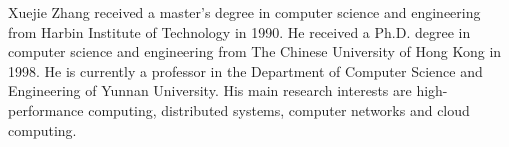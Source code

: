 \documentclass[journal]{IEEEtran}
\begin{document}
\begin{IEEEbiography}{Xuejie Zhang}
	received a master's degree in computer science and engineering from Harbin Institute of Technology in 1990. He received a Ph.D. degree in computer science and engineering from The Chinese University of Hong Kong in 1998. He is currently a professor in the Department of Computer Science and Engineering of Yunnan University. His main research interests are high-performance computing, distributed systems, computer networks and cloud computing.
\end{IEEEbiography}






\end{document}
